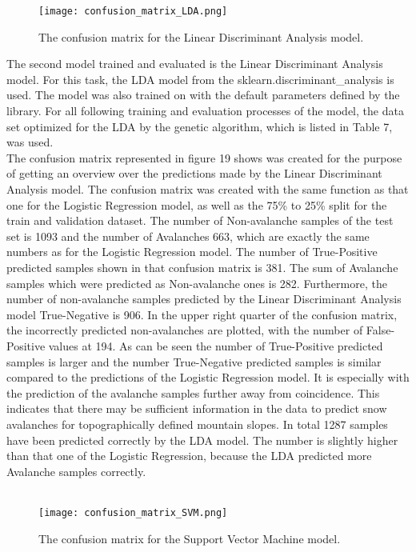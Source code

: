 \documentclass[../masterarbeit.tex]{subfiles}
\begin{document}
\begin{figure}[h]
    \centering
    \texttt{[image: confusion\_matrix\_LDA.png]}
    \caption{The confusion matrix for the Linear Discriminant Analysis model.}
\end{figure}
The second model trained and evaluated is the Linear Discriminant Analysis model.
For this task, the LDA model from the sklearn.discriminant\_analysis \textcite[]{Scikit-learn-lda:2022} is used. The model was also trained on with the default parameters defined by the library. For all following training and evaluation processes of the model, the data set optimized for the LDA by the genetic algorithm, which is listed in Table 7, was used. \\
The confusion matrix represented in figure 19 shows was created for the purpose of getting an overview over the predictions made by the Linear Discriminant Analysis model. The confusion matrix was created with the same function as that one for the Logistic Regression model, as well as the 75\% to 25\% split for the train and validation dataset. The number of Non-avalanche samples of the test set is 1093 and the number of Avalanches 663, which are exactly the same numbers as for the Logistic Regression model.
The number of True-Positive predicted samples shown in that confusion matrix is 381. The sum of Avalanche samples which were predicted as Non-avalanche ones is 282. Furthermore, the number of non-avalanche samples predicted by the Linear Discriminant Analysis model True-Negative is 906. In the upper right quarter of the confusion matrix, the incorrectly predicted non-avalanches are plotted, with the number of False-Positive values at 194. As can be seen the number of True-Positive predicted samples is larger  and the number True-Negative predicted samples is similar compared to the predictions of the Logistic Regression model. It is especially with the prediction of the avalanche samples further away from coincidence. This indicates that there may be sufficient information in the data to predict snow avalanches for topographically defined mountain slopes. In total 1287 samples have been predicted correctly by the LDA model. The number is slightly higher than that one of the Logistic Regression, because the LDA predicted more Avalanche samples correctly.\\~\\
\begin{figure}[h]
    \centering
    \texttt{[image: confusion\_matrix\_SVM.png]}
    \caption{The confusion matrix for the Support Vector Machine model.}
\end{figure}
\end{document}
